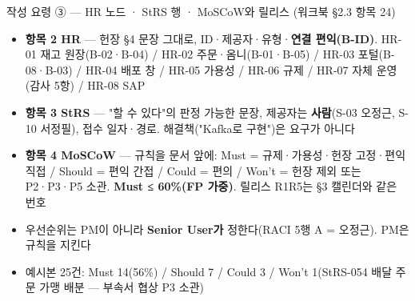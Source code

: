 \begin{frame}{작성 요령 ③ — HR 노드 · StRS 행 · MoSCoW와 릴리스 (워크북 §2.3 항목 2\til{}4)}
\begin{itemize}
\item \textbf{항목 2 HR} — 헌장 §4 문장 그대로, ID·제공자·유형·\textbf{연결 편익(B-ID)}. HR-01 재고 원장(B-02·B-04) / HR-02 주문·옴니(B-01·B-05) / HR-03 포털(B-08·B-03) / HR-04 배포 창 / HR-05 가용성 / HR-06 규제 / HR-07 자체 운영(감사 5항) / HR-08 SAP
\item \textbf{항목 3 StRS} — "\til{}할 수 있다"의 판정 가능한 문장, 제공자는 \textbf{사람}(S-03 오정근, S-10 서정필), 접수 일자·경로. 해결책("Kafka로 구현")은 요구가 아니다
\item \textbf{항목 4 MoSCoW} — 규칙을 문서 앞에: Must = 규제·가용성·헌장 고정·편익 직접 / Should = 편익 간접 / Could = 편의 / Won't = 헌장 제외 또는 P2·P3·P5 소관. \textbf{Must ≤ 60\%(FP 가중)}. 릴리스 R1\til{}R5는 §3 캘린더와 같은 번호
\item 우선순위는 PM이 아니라 \textbf{Senior User가} 정한다(RACI 5행 A = 오정근). PM은 규칙을 지킨다
\item 예시본 25건: Must 14(56\%) / Should 7 / Could 3 / Won't 1(StRS-054 배달 주문 가맹 배분 — 부속서 협상 P3 소관)
\end{itemize}
\end{frame}

